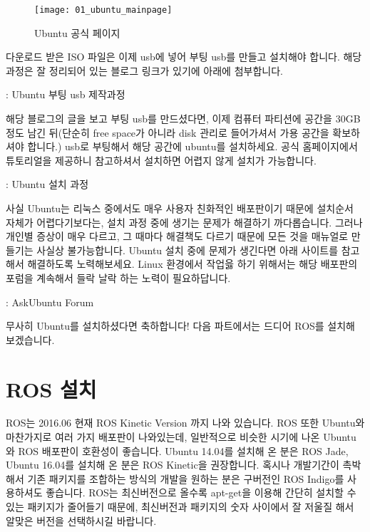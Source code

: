 \documentclass[11pt,fleqn]{book} %
\begin{document}
\begin{figure}[h]
\centering\texttt{[image: 01\_ubuntu\_mainpage]}
\caption{Ubuntu 공식 페이지}
\end{figure}

다운로드 받은 ISO 파일은 이제 usb에 넣어 부팅 usb를 만들고 설치해야 합니다.
해당 과정은 잘 정리되어 있는 블로그 링크가 있기에 아래에 첨부합니다.

\begin{link}
: Ubuntu 부팅 usb 제작과정
\end{link}

해당 블로그의 글을 보고 부팅 usb를 만드셨다면, 이제 컴퓨터 파티션에 공간을 30GB정도 남긴 뒤(단순히 free space가 아니라 disk 관리로 들어가셔서 가용 공간을 확보하셔야 합니다.) usb로 부팅해서 해당 공간에 ubuntu를 설치하세요.
공식 홈페이지에서 튜토리얼을 제공하니 참고하셔서 설치하면 어렵지 않게 설치가 가능합니다.

\begin{link}
: Ubuntu 설치 과정
\end{link}

사실 Ubuntu는 리눅스 중에서도 매우 사용자 친화적인 배포판이기 때문에 설치순서 자체가 어렵다기보다는, 설치 과정 중에 생기는 문제가 해결하기 까다롭습니다.
그러나 개인별 증상이 매우 다르고, 그 때마다 해결책도 다르기 때문에 모든 것을 매뉴얼로 만들기는 사실상 불가능합니다.
Ubuntu 설치 중에 문제가 생긴다면 아래 사이트를 참고해서 해결하도록 노력해보세요.
Linux 환경에서 작업읋 하기 위해서는 해당 배포판의 포럼을 계속해서 들락 날락 하는 노력이 필요하답니다.

\begin{link}
: AskUbuntu Forum
\end{link}

무사히 Ubuntu를 설치하셨다면 축하합니다! 다음 파트에서는 드디어 ROS를 설치해 보겠습니다.


\section{ROS 설치}

ROS는 2016.06 현재 ROS Kinetic Version 까지 나와 있습니다. ROS 또한 Ubuntu와 마찬가지로 여러 가지 배포판이 나와있는데, 일반적으로 비슷한 시기에 나온 Ubuntu와 ROS 배포판이 호환성이 좋습니다.
Ubuntu 14.04를 설치해 온 분은 ROS Jade, Ubuntu 16.04를 설치해 온 분은 ROS Kinetic을 권장합니다. 혹시나 개발기간이 촉박해서 기존 패키지를 조합하는 방식의 개발을 원하는 분은 구버전인 ROS Indigo를 사용하셔도 좋습니다.
ROS는 최신버전으로 올수록 apt-get을 이용해 간단히 설치할 수 있는 패키지가 줄어들기 때문에, 최신버전과 패키지의 숫자 사이에서 잘 저울질 해서 알맞은 버전을 선택하시길 바랍니다.
\end{document}
